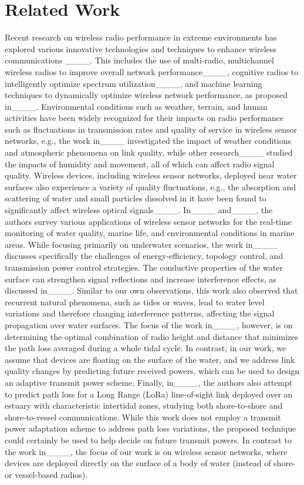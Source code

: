\section{Related Work}
\label{sec:related}

Recent research on wireless radio performance in extreme environments has explored various innovative technologies and techniques to enhance wireless communications ____. This includes the use of multi-radio, multichannel wireless radios to improve overall network performance____, cognitive radios to intelligently optimize spectrum utilization____, and machine learning techniques to dynamically optimize wireless network performance, as proposed in____. Environmental conditions such as weather, terrain, and human activities have been widely recognized for their impacts on radio performance such as fluctuations in transmission rates and quality of service in wireless sensor networks, e.g., the work in____ investigated the impact of weather conditions and atmospheric phenomena on link quality, while other research____ studied the impacts of humidity and movement, all of which can affect radio signal quality. Wireless devices, including wireless sensor networks, deployed near water surfaces also experience a variety of quality fluctuations, e.g., the absorption and scattering of water and small particles dissolved in it have been found to significantly affect wireless optical signals____. In____ and____, the authors survey various applications of wireless sensor networks for the real-time monitoring of water quality, marine life, and environmental conditions in marine areas. While focusing primarily on underwater scenarios, the work in____ discusses specifically the challenges of energy-efficiency, topology control, and transmission power control strategies. The conductive properties of the water surface can strengthen signal reflections and increase interference effects, as discussed in____. Similar to our own observations, this work also observed that recurrent natural phenomena, such as tides or waves, lead to water level variations and therefore changing interference patterns, affecting the signal propagation over water surfaces. The focus of the work in____, however, is on determining the optimal combination of radio height and distance that minimizes the path loss averaged during a whole tidal cycle. In contrast, in our work, we assume that devices are floating on the surface of the water, and we address link quality changes by predicting future received powers, which can be used to design an adaptive transmit power scheme. Finally, in____, the authors also attempt to predict path loss for a Long Range (LoRa) line-of-sight link deployed over an estuary with characteristic intertidal zones, studying both shore-to-shore and shore-to-vessel communications. While this work does not employ a transmit power adaptation scheme to address path loss variations, the proposed technique could certainly be used to help decide on future transmit powers. In contrast to the work in____, the focus of our work is on wireless sensor networks, where devices are deployed directly on the surface of a body of water (instead of shore- or vessel-based radios).